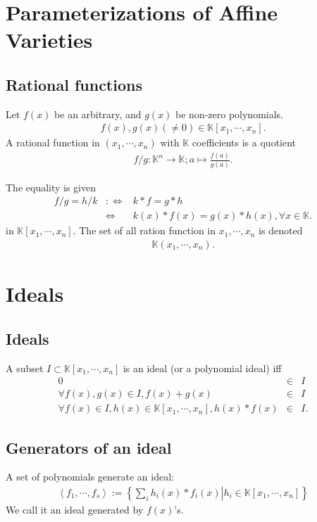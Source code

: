 \documentclass[11pt]{book}
\begin{document}
\section{Parameterizations of Affine Varieties}
\subsection{Rational functions}
Let $f(x)$ be an arbitrary, and $g(x)$ be non-zero polynomials.
\begin{eqnarray}
f(x),g(x) (\neq 0) \in \mathbb{K}[x_1,\cdots,x_n].
\end{eqnarray}
A rational function in $(x_1,\cdots,x_n)$ with $\mathbb{K}$ coefficients is a quotient
\begin{eqnarray}
f/g : \mathbb{K}^n \to \mathbb{K}; a \mapsto \frac{f(a)}{g(a)}.
\end{eqnarray}

The equality is given
\begin{eqnarray}
f/g = h/k &:\Leftrightarrow& k*f = g*h \\
&\Leftrightarrow& k(x)*f(x) = g(x)*h(x), \forall x \in \mathbb{K}.
\end{eqnarray}
in $\mathbb{K}[x_1, \cdots, x_n]$.
The set of all ration function in $x_1, \cdots, x_n$ is denoted
\begin{eqnarray}
\mathbb{K}(x_1, \cdots, x_n).
\end{eqnarray}

\section{Ideals}
\subsection{Ideals}
\label{DefOfIdeal}
A subset $I \subset \mathbb{K}[x_1,\cdots,x_n]$ is an ideal (or a polynomial ideal) iff
\begin{eqnarray}
0 &\in& I \\
\forall f(x),g(x) \in I, f(x) + g(x) &\in& I \\
\forall f(x) \in I, h(x) \in \mathbb{K}[x_1,\cdots,x_n], h(x)*f(x) &\in& I.
\end{eqnarray}

\subsection{Generators of an ideal}
A set of polynomials generate an ideal:
\begin{eqnarray}
\left< f_1, \cdots, f_s \right> := \left\{ \left. \sum_i h_i(x) * f_i(x) \right| h_i \in \mathbb{K}[x_1,\cdots,x_n] \right\}
\end{eqnarray}
We call it an ideal generated by $f(x)$'s.
\end{document}
